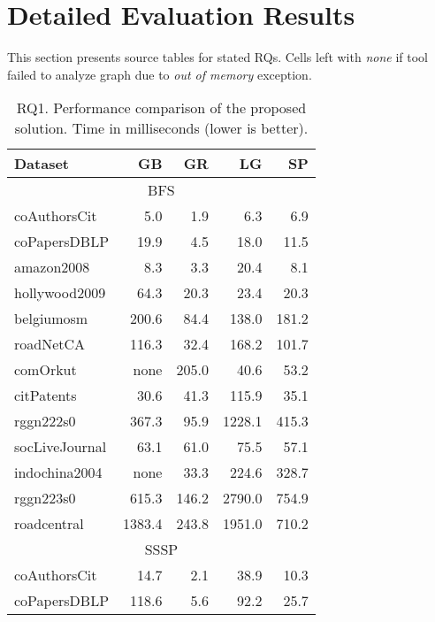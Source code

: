 \section{Detailed Evaluation Results}

This section presents source tables for stated RQs. Cells left with \textit{none} if tool failed to analyze graph due to \textit{out of memory} exception.

\begin{table}[tbp]
    \caption{RQ1. Performance comparison of the proposed solution. Time in milliseconds (lower is better).} 
    \begin{center}
        \begin{tabular}{|l|r|r|r|r|}
        \hline
        Dataset & GB & GR & LG & SP \\
        \hline
        \hline
        \multicolumn{5}{|c|}{BFS} \\
        \hline
        \rowcolor{black!10} coAuthorsCit&5.0&1.9&6.3&6.9\\
        \rowcolor{black!2 } coPapersDBLP&19.9&4.5&18.0&11.5\\
        \rowcolor{black!10} amazon2008&8.3&3.3&20.4&8.1\\
        \rowcolor{black!2 } hollywood2009&64.3&20.3&23.4&20.3\\
        \rowcolor{black!10} belgiumosm&200.6&84.4&138.0&181.2\\
        \rowcolor{black!2 } roadNetCA&116.3&32.4&168.2&101.7\\
        \rowcolor{black!10} comOrkut& none&205.0&40.6&53.2\\
        \rowcolor{black!2 } citPatents&30.6&41.3&115.9&35.1\\
        \rowcolor{black!10} rggn222s0&367.3&95.9&1228.1&415.3\\
        \rowcolor{black!2 } socLiveJournal&63.1&61.0&75.5&57.1\\
        \rowcolor{black!10} indochina2004& none&33.3&224.6&328.7\\
        \rowcolor{black!2 } rggn223s0&615.3&146.2&2790.0&754.9\\
        \rowcolor{black!10} roadcentral&1383.4&243.8&1951.0&710.2\\
        \hline
        \hline
        \multicolumn{5}{|c|}{SSSP} \\
        \hline
        \rowcolor{black!10} coAuthorsCit&14.7&2.1&38.9&10.3\\
        \rowcolor{black!2 } coPapersDBLP&118.6&5.6&92.2&25.7\\

\end{tabular}
\end{center}
\end{table}
